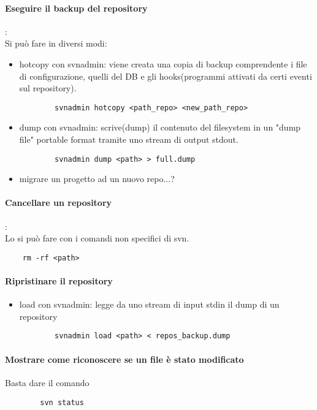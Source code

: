 \documentclass[a4paper]{article}
\begin{document}
	\paragraph{Eseguire il backup del repository}: \\
	Si può fare in diversi modi:
	\begin{itemize}
		\item hotcopy con svnadmin: viene creata una copia di backup comprendente i file di configurazione, quelli del DB e gli hooks(programmi attivati da certi eventi sul repository). \begin{verbatim}
		svnadmin hotcopy <path_repo> <new_path_repo>
		\end{verbatim}
		\item dump con svnadmin: scrive(dump) il contenuto del filesystem in un "dump file" portable format tramite uno stream di output stdout.\begin{verbatim}
		svnadmin dump <path> > full.dump
		\end{verbatim}
		
		\item migrare un progetto ad un nuovo repo...?
		
	\end{itemize}
	\paragraph{Cancellare un repository}: \\
	Lo si può fare con i comandi non specifici di svn.
	\begin{verbatim}
	rm -rf <path>
	\end{verbatim}
	
	\paragraph{Ripristinare il repository}
	\begin{itemize}
		\item load con svnadmin: legge da uno stream di input stdin il dump di un repository
		\begin{verbatim}
		svnadmin load <path> < repos_backup.dump
		\end{verbatim}
	\end{itemize}

	\paragraph{Mostrare come riconoscere se un file è stato modificato}
	Basta dare il comando 
	\begin{verbatim}
		svn status
	\end{verbatim}
\end{document}
